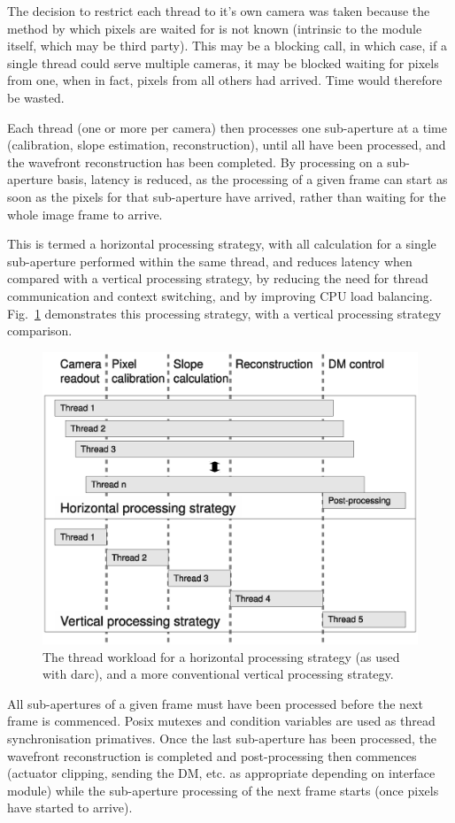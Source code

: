 \documentclass[a4,10pt]{article}
\begin{document}
The decision to restrict each thread to it's own camera was taken
because the method by which pixels are waited for is not known
(intrinsic to the module itself, which may be third party).  This
may be a blocking call, in which case, if a single thread could serve
multiple cameras, it may be blocked waiting for pixels from one, when
in fact, pixels from all others had arrived.  Time would therefore be
wasted. 

Each thread (one or more per camera) then processes one sub-aperture
at a time (calibration, slope estimation, reconstruction), until all
have been processed, and the wavefront reconstruction has been
completed.  By processing on a sub-aperture basis, latency is reduced,
as the processing of a given frame can start as soon as the pixels for
that sub-aperture have arrived, rather than waiting for the whole
image frame to arrive.  

This is termed a horizontal processing strategy, with all calculation
for a single sub-aperture performed within the same thread, and
reduces latency when compared with a vertical processing strategy, by
reducing the need for thread communication and context switching, and
by improving CPU load balancing.  Fig.~\ref{fig:horiz} demonstrates
this processing strategy, with a vertical processing strategy comparison.

\begin{figure}
\includegraphics[width=0.5\linewidth]{processingStrategy.eps}
\caption{The thread workload for a horizontal processing strategy (as
  used with darc), and a more conventional vertical processing
  strategy.}
\label{fig:horiz}
\end{figure}

All sub-apertures of a given frame must have been processed before the
next frame is commenced.  Posix mutexes and condition variables are
used as thread synchronisation primatives.  Once the last sub-aperture
has been processed, the wavefront reconstruction is completed and
post-processing then commences (actuator clipping, sending the DM,
etc. as appropriate depending on interface module) while the
sub-aperture processing of the next frame starts (once pixels have
started to arrive).
\end{document}
